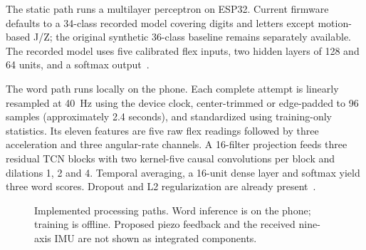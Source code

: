 \documentclass[11pt,letterpaper]{article}
\begin{document}
The static path runs a multilayer perceptron on ESP32. Current firmware defaults
to a 34-class recorded model covering digits and letters except motion-based
J/Z; the original synthetic 36-class baseline remains separately available.
The recorded model uses five calibrated flex inputs, two hidden layers of
128 and 64 units, and a softmax output~\cite{staticrecord}.

The word path runs locally on the phone. Each complete attempt is linearly
resampled at 40~Hz using the device clock, center-trimmed or edge-padded to
96 samples (approximately 2.4 seconds),
and standardized using training-only statistics. Its eleven features are five
raw flex readings followed by three acceleration and three angular-rate
channels. A 16-filter projection feeds three residual TCN blocks with two
kernel-five causal convolutions per block and dilations 1, 2 and 4. Temporal
averaging, a 16-unit dense layer and softmax yield three word scores. Dropout
and L2 regularization are already present~\cite{wordrecord}.

\begin{figure}[H]
\centering
{}
\caption{Implemented processing paths. Word inference is on the phone; training
is offline. Proposed piezo feedback and the received nine-axis IMU are not shown
as integrated components.}
\label{fig:architecture}
\end{figure}
\end{document}
